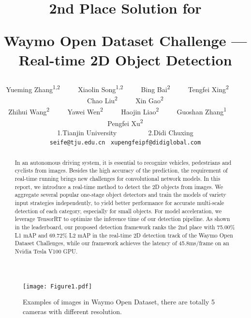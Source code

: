 \documentclass[final]{cvpr}
\begin{document}
\title{2nd Place Solution for 

Waymo Open Dataset Challenge --- Real-time 2D Object Detection}

\author{Yueming Zhang\textsuperscript{1,2} ~~~~ Xiaolin Song\textsuperscript{1,2} ~~~~ Bing Bai\textsuperscript{2} ~~~~ Tengfei Xing\textsuperscript{2}  ~~~~ Chao Liu\textsuperscript{2} ~~~~ Xin Gao\textsuperscript{2}  \\
Zhihui Wang\textsuperscript{2} ~~~~ Yawei Wen\textsuperscript{2} ~~~~ Haojin Liao\textsuperscript{2} ~~~~ Guoshan Zhang\textsuperscript{1} ~~~~ Pengfei Xu\textsuperscript{2}  \\
1.Tianjin University ~~~~~~~~  2.Didi Chuxing\\
{\tt\small seife@tju.edu.cn} \    {\tt\small xupengfeipf@didiglobal.com}
}

\maketitle





\begin{abstract}
In an autonomous driving system, it is essential to recognize vehicles, pedestrians and cyclists from images. Besides the high accuracy of the prediction, the requirement of real-time running brings new challenges for convolutional network models. In this report, we introduce a real-time method to detect the 2D objects from images. We aggregate several popular one-stage object detectors and train the models of variety input strategies independently, to yield better performance for accurate multi-scale detection of each category, especially for small objects. For model acceleration, we leverage TensorRT to optimize the inference time of our detection pipeline. As shown in the leaderboard, our proposed detection framework ranks the 2nd place with 75.00\% L1 mAP and 69.72\% L2 mAP in the real-time 2D detection track of the Waymo Open Dataset Challenges, while our framework achieves the latency of 45.8ms/frame on an Nvidia Tesla V100 GPU.
\end{abstract}

\begin{figure*}[!ht]
    \centering
    \texttt{[image: Figure1.pdf]}
    \caption{Examples of images in Waymo Open Dataset, there are totally 5 cameras with different resolution.}
    \label{waymo}
\end{figure*}
\end{document}
